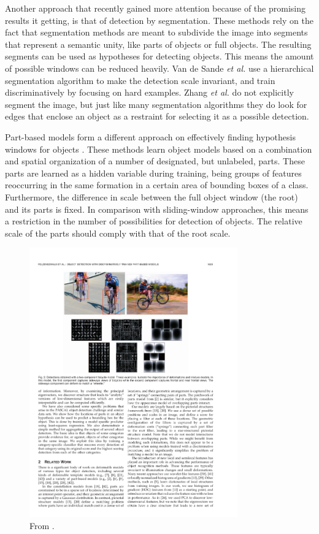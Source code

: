 Another approach that recently gained more attention because of the promising results it getting, is that of detection by segmentation. \cite{van2011segmentation,zhang2010free} These methods rely on the fact that segmentation methods are meant to subdivide the image into segments that represent a semantic unity, like parts of objects or full objects. The resulting segments can be used as hypotheses for detecting objects. This means the amount of possible windows can be reduced heavily. Van de Sande \emph{et al.} \cite{van2011segmentation} use a hierarchical segmentation algorithm to make the detection scale invariant, and train discriminatively by focusing on hard examples. Zhang \emph{et al.} \cite{zhang2010free} do not explicitly segment the image, but just like many segmentation algorithms they do look for edges that enclose an object as a restraint for selecting it as a possible detection.

Part-based models form a different approach on effectively finding hypothesis windows for objects \cite{felzenszwalb2010object}. These methods learn object models based on a combination and spatial organization of a number of designated, but unlabeled, parts. These parts are learned as a hidden variable during training, being groups of features reoccurring in the same formation in a certain area of bounding boxes of a class. Furthermore, the difference in scale between the full object window (the root) and its parts is fixed. In comparison with sliding-window approaches, this means a restriction in the number of possibilities for detection of objects. The relative scale of the parts should comply with that of the root scale.


\begin{figure}[hbt]
    \centering
    \includegraphics[width=0.8\textwidth]{PartBasedDet}
    \caption{From \cite{felzenszwalb2010object}.}
    \label{fig:partbaseddet}
\end{figure}

